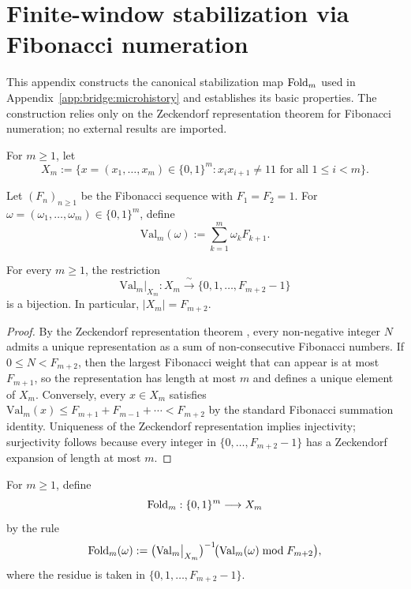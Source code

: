 \section{Finite-window stabilization via Fibonacci numeration}%
\makeatletter\edef{}\makeatother\label{app:bridge:companion}

This appendix constructs the canonical stabilization map $\mathrm{Fold}_m$ used in Appendix~\ref{app:bridge:microhistory} and establishes its basic properties. The construction relies only on the Zeckendorf representation theorem for Fibonacci numeration; no external results are imported.

\begin{definition}\label{def:admissible-set}
For $m\ge 1$, let
\[
X_m:=\bigl\{x=(x_1,\dots,x_m)\in\{0,1\}^m: x_ix_{i+1}\neq 11\text{ for all }1\le i<m\bigr\}.
\]
\end{definition}

\begin{definition}\label{def:fibonacci-valuation}
Let $(F_n)_{n\ge 1}$ be the Fibonacci sequence with $F_1=F_2=1$. For $\omega=(\omega_1,\dots,\omega_m)\in\{0,1\}^m$, define
\[
\mathrm{Val}_m(\omega):=\sum_{k=1}^m \omega_k F_{k+1}.
\]
\end{definition}

\begin{proposition}\label{prop:zeckendorf-bijection}
For every $m\ge 1$, the restriction
\[
\mathrm{Val}_m\big|_{X_m}:X_m\xrightarrow{\;\sim\;}\{0,1,\dots,F_{m+2}-1\}
\]
is a bijection. In particular, $|X_m|=F_{m+2}$.
\end{proposition}

\begin{proof}
By the Zeckendorf representation theorem \cite{LindMarcus1995}, every non-negative integer $N$ admits a unique representation as a sum of non-consecutive Fibonacci numbers. If $0\le N<F_{m+2}$, then the largest Fibonacci weight that can appear is at most $F_{m+1}$, so the representation has length at most $m$ and defines a unique element of $X_m$. Conversely, every $x\in X_m$ satisfies $\mathrm{Val}_m(x)\le F_{m+1}+F_{m-1}+\cdots<F_{m+2}$ by the standard Fibonacci summation identity. Uniqueness of the Zeckendorf representation implies injectivity; surjectivity follows because every integer in $\{0,\dots,F_{m+2}-1\}$ has a Zeckendorf expansion of length at most $m$.
\end{proof}

\begin{definition}\label{def:fold-map}
For $m\ge 1$, define
\[
\mathrm{Fold}_m:\{0,1\}^m\longrightarrow X_m
\]
by the rule
\[
\mathrm{Fold}_m(\omega):=\bigl(\mathrm{Val}_m\big|_{X_m}\bigr)^{-1}\!\bigl(\mathrm{Val}_m(\omega)\bmod F_{m+2}\bigr),
\]
where the residue is taken in $\{0,1,\dots,F_{m+2}-1\}$.
\end{definition}

